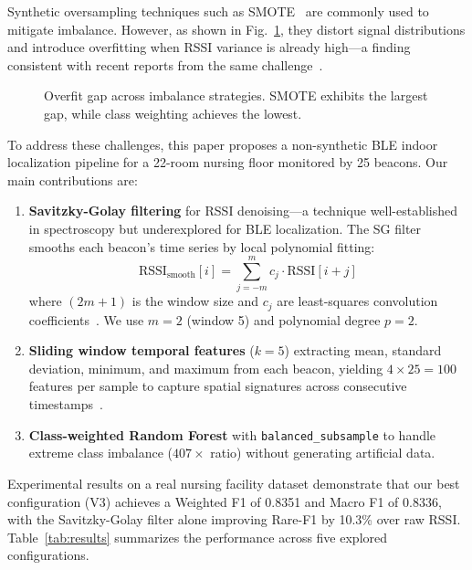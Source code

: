 Synthetic oversampling techniques such as SMOTE~\cite{chawla2002} are commonly used to mitigate imbalance. However, as shown in Fig.~\ref{fig:overfit}, they distort signal distributions and introduce overfitting when RSSI variance is already high---a finding consistent with recent reports from the same challenge~\cite{friedrich2024}.

\begin{figure}[h]
\centering
{}
\caption{Overfit gap across imbalance strategies. SMOTE exhibits the largest gap, while class weighting achieves the lowest.}
\label{fig:overfit}
\end{figure}

To address these challenges, this paper proposes a non-synthetic BLE indoor localization pipeline for a 22-room nursing floor monitored by 25 beacons. Our main contributions are:

\begin{enumerate}
    \item \textbf{Savitzky-Golay filtering} for RSSI denoising---a technique well-established in spectroscopy but underexplored for BLE localization. The SG filter smooths each beacon's time series by local polynomial fitting:
    \begin{equation}
    \text{RSSI}_{\text{smooth}}[i] = \sum_{j = -m}^{m} c_j \cdot \text{RSSI}[i + j]
    \label{eq:sg}
    \end{equation}
    \noindent where $(2m + 1)$ is the window size and $c_j$ are least-squares convolution coefficients~\cite{savitzky1964}. We use $m = 2$ (window 5) and polynomial degree $p = 2$.

    \item \textbf{Sliding window temporal features} ($k = 5$) extracting mean, standard deviation, minimum, and maximum from each beacon, yielding $4 \times 25 = 100$ features per sample to capture spatial signatures across consecutive timestamps~\cite{sensors2023}.

    \item \textbf{Class-weighted Random Forest} with \texttt{balanced\_subsample} to handle extreme class imbalance ($407\times$ ratio) without generating artificial data.
\end{enumerate}

Experimental results on a real nursing facility dataset demonstrate that our best configuration (V3) achieves a Weighted F1 of 0.8351 and Macro F1 of 0.8336, with the Savitzky-Golay filter alone improving Rare-F1 by 10.3\% over raw RSSI. Table~\ref{tab:results} summarizes the performance across five explored configurations.

